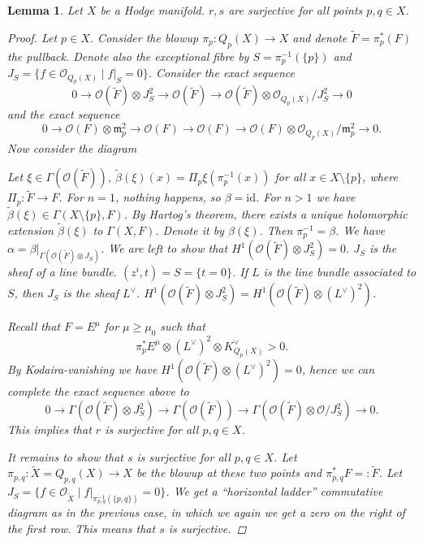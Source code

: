 \documentclass[12pt]{article}
\theoremstyle{darkgreentheorem}
\newtheorem{lm}[thm]{Lemma}
\theoremstyle{darkbluedefinition}
\theoremstyle{darkredexample}
\theoremstyle{remark}
\newcommand{\1}{\mathbbm{1}}
\renewcommand{\O}{\mathcal{O}}
\newcommand{\m}{\mathfrak{m}}
\newcommand{\ot}{\otimes}
\newcommand{\id}{\mathrm{id}}
\newcommand{\dual}{^{\vee}}
\begin{document}
\begin{lm}
    Let $X$ be a Hodge manifold.
    $r,s$ are surjective for all points $p,q\in X$.
    \begin{proof}
	Let $p\in X$.
	Consider the blowup $\pi_{p}\colon Q_{p}(X)\to X$ and denote $\tilde{F}=\pi_{p}^{*}(F)$ the pullback.
	Denote also the exceptional fibre by $S=\pi_{p}^{-1}(\{p\})$ and $J_{S}=\{f\in \O_{Q_{p}(X)}\mid f|_{S}=0\}$.
	Consider the exact sequence
	\[ 0\to \O(\tilde{F})\ot J_{S}^{2}\to \O(\tilde{F})\to \O(\tilde{F})\ot \O_{Q_{p}(X)}/J_{S}^{2}\to 0 \]
	and the exact sequence
	\[ 0\to \O(F)\ot \m_{p}^{2}\to \O(F)\to \O(F)\to \O(F)\ot \O_{Q_{p}(X)}/\m_{p}^{2}\to 0. \]
	Now consider the diagram
	\begin{center}
	\end{center}
	Let $\xi\in \Gamma(\O(\tilde{F}))$, $\tilde{\beta}(\xi)(x)=\Pi_{p}\xi(\pi_{p}^{-1}(x))$ for all $x\in X\setminus \{p\}$, where $\Pi_{p}\colon \tilde{F}\to F$.
	For $n=1$, nothing happens, so $\beta=\id$.
	For $n>1$ we have $\tilde{\beta}(\xi)\in \Gamma(X\setminus \{p\},F)$.
	By Hartog's theorem, there exists a unique holomorphic extension $\tilde{\beta}(\xi)$ to $\Gamma(X,F)$.
	Denote it by $\beta(\xi)$.
	Then $\pi_{p}^{-1}=\beta$.
	We have $\alpha=\beta|_{\Gamma(\O(\tilde{F})\ot J_{S})}$.
	We are left to show that $H^{1}(\O(\tilde{F})\ot J_{S}^{2})=0$.
	$J_{S}$ is the sheaf of a line bundle.
	$(z^{i},t)=S=\{t=0\}$.
	If $L$ is the line bundle associated to $S$, then $J_{S}$ is the sheaf $L\dual$.
	$H^{1}(\O(\tilde{F})\ot J_{S}^{2})=H^{1}(\O(\tilde{F})\ot (L\dual)^{2})$.

	Recall that $F=E^{\mu}$ for $\mu\geqslant \mu_{0}$ such that
	\[ \pi_{p}^{*}E^{\mu}\ot (L\dual)^{2}\ot K_{Q_{p}(X)}\dual >0.\]
	By Kodaira-vanishing we have $H^{1}(\O(\tilde{F})\ot (L\dual)^{2})=0$, hence we can complete the exact sequence above to
	\[ 0\to \Gamma(\O(\tilde{F})\ot J_{S}^{2})\to \Gamma(\O(\tilde{F}))\to \Gamma(\O(\tilde{F})\ot \O/J_{S}^{2}) \to 0.\]
	This implies that $r$ is surjective for all $p,q\in X$.
	
	It remains to show that $s$ is surjective for all $p,q\in X$.
	Let $\pi_{p,q}\colon \tilde{X}=Q_{p,q}(X)\to X$ be the blowup at these two points and $\pi_{p,q}^{*}F=:\tilde{F}$.
	Let $J_{S}=\{f\in \O_{\tilde{X}}\mid f|_{\pi_{p,q}^{-1}(\{p,q\})}=0 \}$.
	We get a ``horizontal ladder'' commutative diagram as in the previous case, in which we again we get a zero on the right of the first row.
	This means that $s$ is surjective.
    \end{proof}
\end{lm}
\end{document}
